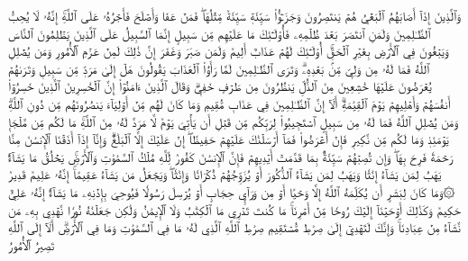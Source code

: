 وَٱلَّذِينَ إِذَآ أَصَابَهُمُ ٱلۡبَغۡيُ هُمۡ يَنتَصِرُونَ
وَجَزَـٰٓؤُاْ سَيِّئَةٖ سَيِّئَةٞ مِّثۡلُهَاۖ فَمَنۡ عَفَا وَأَصۡلَحَ فَأَجۡرُهُۥ عَلَى ٱللَّهِۚ إِنَّهُۥ لَا يُحِبُّ ٱلظَّـٰلِمِينَ
وَلَمَنِ ٱنتَصَرَ بَعۡدَ ظُلۡمِهِۦ فَأُوْلَـٰٓئِكَ مَا عَلَيۡهِم مِّن سَبِيلٍ
إِنَّمَا ٱلسَّبِيلُ عَلَى ٱلَّذِينَ يَظۡلِمُونَ ٱلنَّاسَ وَيَبۡغُونَ فِي ٱلۡأَرۡضِ بِغَيۡرِ ٱلۡحَقِّۚ أُوْلَـٰٓئِكَ لَهُمۡ عَذَابٌ أَلِيمٞ
وَلَمَن صَبَرَ وَغَفَرَ إِنَّ ذَٰلِكَ لَمِنۡ عَزۡمِ ٱلۡأُمُورِ
وَمَن يُضۡلِلِ ٱللَّهُ فَمَا لَهُۥ مِن وَلِيّٖ مِّنۢ بَعۡدِهِۦۗ وَتَرَى ٱلظَّـٰلِمِينَ لَمَّا رَأَوُاْ ٱلۡعَذَابَ يَقُولُونَ هَلۡ إِلَىٰ مَرَدّٖ مِّن سَبِيلٖ
وَتَرَىٰهُمۡ يُعۡرَضُونَ عَلَيۡهَا خَٰشِعِينَ مِنَ ٱلذُّلِّ يَنظُرُونَ مِن طَرۡفٍ خَفِيّٖۗ وَقَالَ ٱلَّذِينَ ءَامَنُوٓاْ إِنَّ ٱلۡخَٰسِرِينَ ٱلَّذِينَ خَسِرُوٓاْ أَنفُسَهُمۡ وَأَهۡلِيهِمۡ يَوۡمَ ٱلۡقِيَٰمَةِۗ أَلَآ إِنَّ ٱلظَّـٰلِمِينَ فِي عَذَابٖ مُّقِيمٖ
وَمَا كَانَ لَهُم مِّنۡ أَوۡلِيَآءَ يَنصُرُونَهُم مِّن دُونِ ٱللَّهِۗ وَمَن يُضۡلِلِ ٱللَّهُ فَمَا لَهُۥ مِن سَبِيلٍ
ٱسۡتَجِيبُواْ لِرَبِّكُم مِّن قَبۡلِ أَن يَأۡتِيَ يَوۡمٞ لَّا مَرَدَّ لَهُۥ مِنَ ٱللَّهِۚ مَا لَكُم مِّن مَّلۡجَإٖ يَوۡمَئِذٖ وَمَا لَكُم مِّن نَّكِيرٖ
فَإِنۡ أَعۡرَضُواْ فَمَآ أَرۡسَلۡنَٰكَ عَلَيۡهِمۡ حَفِيظًاۖ إِنۡ عَلَيۡكَ إِلَّا ٱلۡبَلَٰغُۗ وَإِنَّآ إِذَآ أَذَقۡنَا ٱلۡإِنسَٰنَ مِنَّا رَحۡمَةٗ فَرِحَ بِهَاۖ وَإِن تُصِبۡهُمۡ سَيِّئَةُۢ بِمَا قَدَّمَتۡ أَيۡدِيهِمۡ فَإِنَّ ٱلۡإِنسَٰنَ كَفُورٞ
لِّلَّهِ مُلۡكُ ٱلسَّمَٰوَٰتِ وَٱلۡأَرۡضِۚ يَخۡلُقُ مَا يَشَآءُۚ يَهَبُ لِمَن يَشَآءُ إِنَٰثٗا وَيَهَبُ لِمَن يَشَآءُ ٱلذُّكُورَ
أَوۡ يُزَوِّجُهُمۡ ذُكۡرَانٗا وَإِنَٰثٗاۖ وَيَجۡعَلُ مَن يَشَآءُ عَقِيمًاۚ إِنَّهُۥ عَلِيمٞ قَدِيرٞ
۞وَمَا كَانَ لِبَشَرٍ أَن يُكَلِّمَهُ ٱللَّهُ إِلَّا وَحۡيًا أَوۡ مِن وَرَآيِٕ حِجَابٍ أَوۡ يُرۡسِلَ رَسُولٗا فَيُوحِيَ بِإِذۡنِهِۦ مَا يَشَآءُۚ إِنَّهُۥ عَلِيٌّ حَكِيمٞ
وَكَذَٰلِكَ أَوۡحَيۡنَآ إِلَيۡكَ رُوحٗا مِّنۡ أَمۡرِنَاۚ مَا كُنتَ تَدۡرِي مَا ٱلۡكِتَٰبُ وَلَا ٱلۡإِيمَٰنُ وَلَٰكِن جَعَلۡنَٰهُ نُورٗا نَّهۡدِي بِهِۦ مَن نَّشَآءُ مِنۡ عِبَادِنَاۚ وَإِنَّكَ لَتَهۡدِيٓ إِلَىٰ صِرَٰطٖ مُّسۡتَقِيمٖ
صِرَٰطِ ٱللَّهِ ٱلَّذِي لَهُۥ مَا فِي ٱلسَّمَٰوَٰتِ وَمَا فِي ٱلۡأَرۡضِۗ أَلَآ إِلَى ٱللَّهِ تَصِيرُ ٱلۡأُمُورُ
